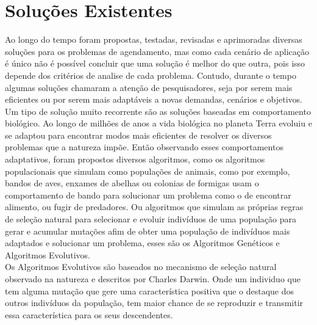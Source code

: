 \section{Soluções Existentes}
Ao longo do tempo foram propostas, testadas, revisadas e aprimoradas diversas soluções para os problemas de agendamento, mas como cada cenário de aplicação é único não é possível concluir que uma solução é melhor do que outra, pois isso depende dos critérios de analise de cada problema. Contudo, durante o tempo algumas soluções chamaram a atenção de pesquisadores, seja por serem mais eficientes ou por serem mais adaptáveis a novas demandas, cenários e objetivos.\\
\indent Um tipo de solução muito recorrente são as soluções baseadas em comportamento biológico. 
%
Ao longo de milhões de anos a vida biológica no planeta Terra evoluiu e se adaptou para encontrar modos mais eficientes de resolver os diversos problemas que a natureza impõe. 
Então observando esses comportamentos adaptativos, foram propostos diversos algoritmos, 
como os algoritmos populacionais que simulam como populações de animais, como por exemplo, bandos de aves, enxames de abelhas ou colonias de formigas usam o comportamento de bando para solucionar um problema como o de encontrar alimento, ou fugir de predadores. 
Ou algoritmos que simulam as próprias regras de seleção natural para selecionar e evoluir indivíduos de uma população para gerar e acumular mutações afim de obter uma população de indivíduos mais adaptados e solucionar um problema, esses são os Algoritmos Genéticos e Algoritmos Evolutivos.\\
\indent Os Algoritmos Evolutivos são baseados no mecanismo de seleção natural observado na natureza e descritos por Charles Darwin. Onde um individuo que tem alguma mutação que gere uma característica positiva que o destaque dos outros indivíduos da população, tem maior chance de se reproduzir e transmitir essa característica para os seus descendentes.\\

